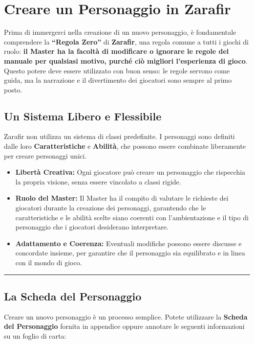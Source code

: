 \documentclass[../manuale_main.tex]{subfiles}
\begin{document}
\section{Creare un Personaggio in Zarafir}

Prima di immergerci nella creazione di un nuovo personaggio, è fondamentale comprendere la \textbf{“Regola Zero”} di \textbf{Zarafir}, una regola comune a tutti i giochi di ruolo: \textbf{il Master ha la facoltà di modificare o ignorare le regole del manuale per qualsiasi motivo, purché ciò migliori l’esperienza di gioco}. Questo potere deve essere utilizzato con buon senso: le regole servono come guida, ma la narrazione e il divertimento dei giocatori sono sempre al primo posto.

\vspace{0.3cm}

\subsection{Un Sistema Libero e Flessibile}
Zarafir non utilizza un sistema di classi predefinite. I personaggi sono definiti dalle loro \textbf{Caratteristiche} e \textbf{Abilità}, che possono essere combinate liberamente per creare personaggi unici. 

\begin{itemize}
    \item \textbf{Libertà Creativa:} Ogni giocatore può creare un personaggio che rispecchia la propria visione, senza essere vincolato a classi rigide.
    \item \textbf{Ruolo del Master:} Il Master ha il compito di valutare le richieste dei giocatori durante la creazione dei personaggi, garantendo che le caratteristiche e le abilità scelte siano coerenti con l’ambientazione e il tipo di personaggio che i giocatori desiderano interpretare.
    \item \textbf{Adattamento e Coerenza:} Eventuali modifiche possono essere discusse e concordate insieme, per garantire che il personaggio sia equilibrato e in linea con il mondo di gioco.
\end{itemize}

\vspace{0.5cm}
\rule{\textwidth}{0.4pt}
\vspace{0.5cm}

\subsection{La Scheda del Personaggio}
Creare un nuovo personaggio è un processo semplice. Potete utilizzare la \textbf{Scheda del Personaggio} fornita in appendice oppure annotare le seguenti informazioni su un foglio di carta:
\end{document}
